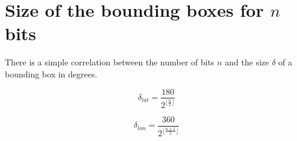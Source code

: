 \documentclass[a4paper,11pt,oneside]{scrartcl}
\begin{document}
\section{Size of the bounding boxes for $n$ bits} %
\label{sec:Size of the bounding boxes for $n$ bits}
There is a simple correlation between the number of bits $n$ and the size $\delta$ of a bounding box in degrees.

\begin{displaymath}
  \delta_{lat} = \frac{180}{2^{\lfloor \frac{n}{2} \rfloor}}
\end{displaymath}

\begin{displaymath}
  \delta_{lon} = \frac{360}{2^{\lfloor \frac{n+1}{2} \rfloor}}
\end{displaymath}



\end{document}
